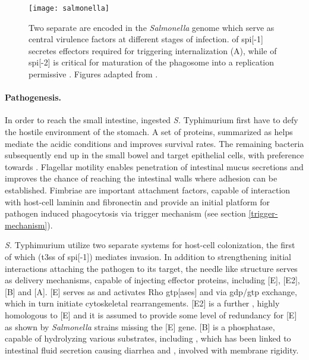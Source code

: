\begin{figure}[t]
  \centering
  \texttt{[image: salmonella]}
  \caption[Overview of mechanisms for infection of epithelial cells by \textit{Salmonella} and for establishing an intracellular replicatory niche.]{Two separate  are encoded in the \textit{Salmonella} genome which serve as central virulence factors at different stages of infection.  of \acrshort{spi}[-1] secretes effectors required for triggering internalization (A), while  of \acrshort{spi}[-2] is critical for maturation of the phagosome into a replication permissive . Figures adapted from \citet{Haraga2008}.}
  \label{fig:salmonella}
\end{figure}

\paragraph{Pathogenesis.}
In order to reach the small intestine, ingested \textit{S.} Typhimurium first have to defy the hostile environment of the stomach. A set of proteins, summarized as  helps mediate the acidic conditions and improves survival rates. The remaining bacteria subsequently end up in the small bowel and target epithelial cells, with preference towards . Flagellar motility enables penetration of intestinal mucus secretions and improves the chance of reaching the intestinal walls where adhesion can be established. Fimbriae are important attachment factors, capable of interaction with host-cell laminin and fibronectin and provide an initial platform for pathogen induced phagocytosis via trigger mechanism (see section \ref{trigger-mechanism}). 

\textit{S.} Typhimurium utilize two separate  systems for host-cell colonization, the first of which (\acrshort{t3ss} of \acrshort{spi}[-1]) mediates invasion. In addition to strengthening initial interactions attaching the pathogen to its target, the needle like structure serves as delivery mechanisms, capable of injecting effector proteins, including [E], [E2], [B] and [A]. [E] serves as  and activates Rho \acrshort{gtp}[ases]  and  via \acrshort{gdp}\slash \acrshort{gtp} exchange, which in turn initiate cytoskeletal rearrangements. [E2] is a further , highly homologous to [E] and it is assumed to provide some level of redundancy for [E] as shown by \textit{Salmonella} strains missing the [E] gene. [B] is a phosphatase, capable of hydrolyzing various substrates, including , which has been linked to intestinal fluid secretion causing diarrhea and , involved with membrane rigidity. 

